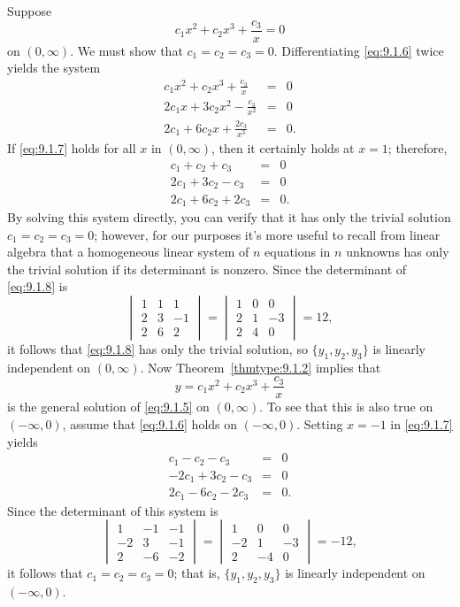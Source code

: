 \documentclass{ximera}
\begin{document}
\begin{example}
\begin{explanation}
Suppose
\begin{equation} \label{eq:9.1.6}
c_1x^2+c_2x^3+\frac{c_3}{x}=0
\end{equation}
on $(0,\infty)$. We must show that $c_1=c_2=c_3=0$. Differentiating
\eqref{eq:9.1.6} twice yields  the system
\begin{equation} \label{eq:9.1.7}
\begin{array}{rcl}
c_1x^2+c_2x^3+\frac{c_3}{x}&=&0\\
2c_1x+3c_2x^2-\frac{c_3}{x^2}&=&0\\
2c_1+6c_2x+\frac{2c_3}{x^3}&=&0.
\end{array}
\end{equation}
If \eqref{eq:9.1.7} holds for all $x$ in $(0,\infty)$, then it
certainly  holds at $x=1$;  therefore,
\begin{equation} \label{eq:9.1.8}
\begin{array}{rcl}
c_1+c_2+c_3&=&0\\
2c_1+3c_2-c_3&=&0\\
2c_1+6c_2+2c_3&=&0.
\end{array}
\end{equation}
By solving this system directly, you can verify that it has only the
trivial solution $c_1=c_2=c_3=0$;     however, for our purposes it's more
useful to recall from linear algebra that a homogeneous linear system
of $n$ equations in $n$ unknowns has only the trivial solution if its
determinant is nonzero. Since the determinant of \eqref{eq:9.1.8} is
$$
\begin{vmatrix}1&1&1\\2&3&-1\\2&6&2\end{vmatrix}=
\begin{vmatrix}1&0&0\\2&1&-3\\2&4&0\end{vmatrix}=12,
$$
it follows that \eqref{eq:9.1.8} has only the trivial solution, so
$\{y_1,y_2,y_3\}$ is linearly independent on $(0,\infty)$. Now
Theorem~\ref{thmtype:9.1.2} implies that
$$
y=c_1x^2+c_2x^3+\frac{c_3}{x}
$$
is the general solution of \eqref{eq:9.1.5} on $(0,\infty)$.
To see that this is also true
 on $(-\infty,0)$,  assume that \eqref{eq:9.1.6} holds on
$(-\infty,0)$. Setting $x=-1$ in \eqref{eq:9.1.7} yields
\begin{eqnarray*}
c_1-c_2-c_3&=&0\\
-2c_1+3c_2-c_3&=&0\\
2c_1-6c_2-2c_3&=&0.
\end{eqnarray*}
Since the determinant of this system is
$$
\begin{vmatrix}1&-1&-1\\-2&3&-1\\2&-6&-2\end{vmatrix}=
\begin{vmatrix}1&0&0\\-2&1&-3\\2&-4&0\end{vmatrix}=-12,
$$
it follows that $c_1=c_2=c_3=0$; that is, $\{y_1,y_2,y_3\}$
is linearly independent on $(-\infty,0)$.


\end{explanation}
\end{example}
\end{document}
